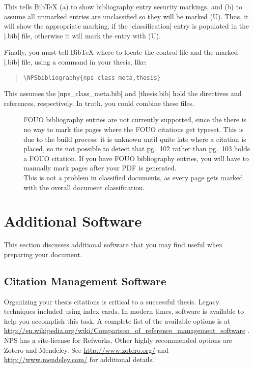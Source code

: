 This tells Bib\TeX{} (a) to show bibliography entry security markings, and
(b) to assume all unmarked entries are unclassified so they will
be marked (U). Thus, it will show the appropriate marking, if the
|classification| entry is populated in the |.bib| file, otherwise it will
mark the entry with (U).

Finally, you must tell Bib\TeX{} where to locate the control file and
the marked |.bib| file, using a command in your thesis, like:
\begin{quotation}
\begin{Verbatim}
\NPSbibliography{nps_class_meta,thesis}
\end{Verbatim}
\end{quotation}

This assumes the |nps_class_meta.bib| and |thesis.bib|
hold the directives and references, respectively. 
In truth, you could combine these files.

\begin{description}
\item[]
FOUO bibliography entries are not currently supported, since the
there is no way to mark the pages where the FOUO citations
get typeset. This is due to the build process: it is unknown
until quite late where a citation is placed, so its not possible
to detect that pg.\ 102 rather than pg.\ 103 holds a FOUO citation.
If you have FOUO bibliography entries, you will have to manually
mark pages after your PDF is generated.\\
This is not a problem in classified documents, as every page gets
marked with the overall document classification. 
\end{description}

\section{Additional Software}
This section discusses additional software that you may find useful
when preparing your document.
\subsection{Citation Management Software}
Organizing your thesis citations is critical to a successful thesis.  Legacy techniques included using index cards.
In modern times, software is available to help you accomplish this task.  A complete list of the available options is
at \url{http://en.wikipedia.org/wiki/Comparison_of_reference_management_software} .  NPS has a site-license for Refworks.
Other highly recommended options are Zotero and Mendeley.  See \url{http://www.zotero.org/} and \url{http://www.mendeley.com/}
for additional details.
   

